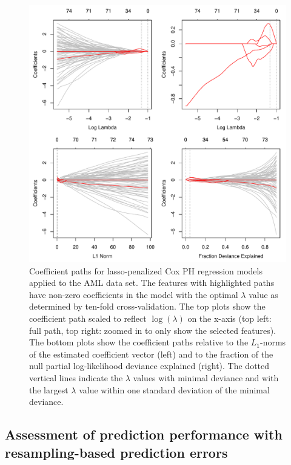 \documentclass[]{jss}
\begin{document}
\begin{figure}[H]
\begin{center}
\includegraphics{c060_vignette-glmnet4}
\end{center}
\caption{\label{fig:coefpath}Coefficient paths for lasso-penalized Cox PH regression models applied to the AML data set. The features with highlighted paths have non-zero coefficients in the model with the optimal $\lambda$ value as determined by ten-fold cross-validation. %
The top plots show the coefficient path scaled to reflect $\log(\lambda)$ on the x-axis (top left: full path, top right: zoomed in to only show the selected features). The bottom plots show the coefficient paths relative to the $L_1$-norms of the estimated coefficient vector (left) and to the fraction of the null partial log-likelihood deviance explained (right).
The dotted vertical lines indicate the $\lambda$ values with minimal deviance and with the largest $\lambda$ value within one standard deviation of the minimal deviance.}
\end{figure}

\subsection{Assessment of prediction performance with resampling-based prediction errors}
\label{pec}
\end{document}
